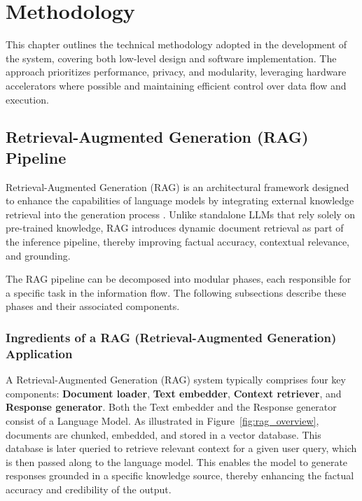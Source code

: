 \chapter{Methodology}
\label{ch:Methodology}
This chapter outlines the technical methodology adopted in the development of the system, covering both low-level design and software implementation. The approach prioritizes performance, privacy, and modularity, leveraging hardware accelerators where possible and maintaining efficient control over data flow and execution.

\section{Retrieval-Augmented Generation (RAG) Pipeline}
\label{sec:RAGPipeline}

Retrieval-Augmented Generation (RAG) is an architectural framework designed to enhance the capabilities of language models by integrating external knowledge retrieval into the generation process \cite{lewis2020rag}. Unlike standalone LLMs that rely solely on pre-trained knowledge, RAG introduces dynamic document retrieval as part of the inference pipeline, thereby improving factual accuracy, contextual relevance, and grounding.

The RAG pipeline can be decomposed into modular phases, each responsible for a specific task in the information flow. The following subsections describe these phases and their associated components.

\subsection{Ingredients of a RAG (Retrieval-Augmented Generation) Application}
\label{subsec:IngredientsOfRag}

A Retrieval-Augmented Generation (RAG) system typically comprises four key components: \textbf{Document loader}, \textbf{Text embedder}, \textbf{Context retriever}, and \textbf{Response generator}. Both the Text embedder and the Response generator consist of a Language Model. As illustrated in Figure~\ref{fig:rag_overview}, documents are chunked, embedded, and stored in a vector database. This database is later queried to retrieve relevant context for a given user query, which is then passed along to the language model. This enables the model to generate responses grounded in a specific knowledge source, thereby enhancing the factual accuracy and credibility of the output.

